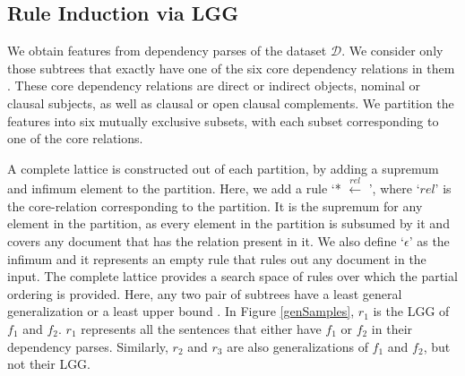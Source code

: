 











\subsection{Rule Induction via LGG}
\label{filtering}

We obtain features from dependency parses of the dataset $\mathcal{D}$. %
We consider only those subtrees that exactly have one of the six core dependency relations in them \cite{de-marneffe-etal-2014-universal, nivre-etal-2020-universal}. These core dependency relations are direct or indirect objects, nominal or clausal subjects, as well as clausal or open clausal complements. We partition the features into six mutually exclusive subsets, with each subset corresponding to one of the core relations. 

A complete lattice is constructed out of each partition, by adding a supremum and infimum element to the partition. Here, we add a rule `* $\xleftarrow{rel}$ {\sc *}', where `${rel}$' is the core-relation corresponding to the partition. It is the supremum for any element in the partition, as every element in the partition is subsumed by it and covers any document that has the relation present in it. We also define `$\epsilon$' as the infimum and it represents an empty rule that rules out any document in the input. The complete lattice provides a search space of rules over which the partial ordering is provided. Here, any two pair of subtrees have a least general generalization or a least upper bound \cite{Raedt2010}. In Figure \ref{genSamples}, $r_1$ is the LGG of $f_1$ and $f_2$.  $r_1$ represents all the sentences that either have $f_1$ or $f_2$ in their dependency parses. Similarly, $r_2$ and $r_3$ are also generalizations of $f_1$ and $f_2$, but not their LGG.


